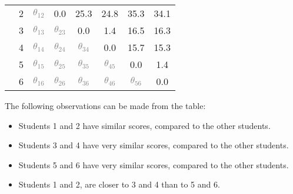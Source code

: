 \begin{boxedstuff}
\begin{example}
\begin{small}
\begin{center}
\begin{tabular}{lc|cccccc|}
                \multicolumn{1}{|l|}{} & 2 & \multicolumn{1}{c|}{\textcolor{gray}{$\theta_{12}$}} & \multicolumn{1}{c|}{0.0} & \multicolumn{1}{c|}{25.3} & \multicolumn{1}{c|}{24.8} & \multicolumn{1}{c|}{35.3} & 34.1 \\ \cline{2-8} 
                \multicolumn{1}{|l|}{} & 3 & \multicolumn{1}{c|}{\textcolor{gray}{$\theta_{13}$}} & \multicolumn{1}{c|}{\textcolor{gray}{$\theta_{23}$}} & \multicolumn{1}{c|}{0.0} & \multicolumn{1}{c|}{1.4} & \multicolumn{1}{c|}{16.5} & 16.3 \\ \cline{2-8} 
                \multicolumn{1}{|l|}{} & 4 & \multicolumn{1}{c|}{\textcolor{gray}{$\theta_{14}$}} & \multicolumn{1}{c|}{\textcolor{gray}{$\theta_{24}$}} & \multicolumn{1}{c|}{\textcolor{gray}{$\theta_{34}$}} & \multicolumn{1}{c|}{0.0} & \multicolumn{1}{c|}{15.7} & 15.3 \\ \cline{2-8} 
                \multicolumn{1}{|l|}{} & 5 & \multicolumn{1}{c|}{\textcolor{gray}{$\theta_{15}$}} & \multicolumn{1}{c|}{\textcolor{gray}{$\theta_{25}$}} & \multicolumn{1}{c|}{\textcolor{gray}{$\theta_{35}$}} & \multicolumn{1}{c|}{\textcolor{gray}{$\theta_{45}$}} & \multicolumn{1}{c|}{0.0} & 1.4 \\ \cline{2-8} 
                \multicolumn{1}{|l|}{} & 6 & \multicolumn{1}{c|}{\textcolor{gray}{$\theta_{16}$}} & \multicolumn{1}{c|}{\textcolor{gray}{$\theta_{26}$}} & \multicolumn{1}{c|}{\textcolor{gray}{$\theta_{36}$}} & \multicolumn{1}{c|}{\textcolor{gray}{$\theta_{46}$}} & \multicolumn{1}{c|}{\textcolor{gray}{$\theta_{56}$}} & 0.0 \\ \hline
                \end{tabular}
            \end{center}
        \end{small}
        
        \noindent The following observations can be made from the table:
        \begin{itemize}
            \item Students 1 and 2 have similar scores, compared to the other students.
            \item Students 3 and 4 have very similar scores, compared to the other students.
            \item Students 5 and 6 have very similar scores, compared to the other students.
            \item Students 1 and 2, are closer to 3 and 4 than to 5 and 6.
        \end{itemize}


\end{example}
\end{boxedstuff}
